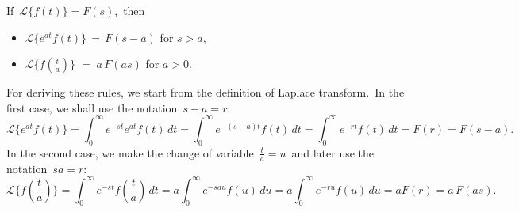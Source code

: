 \documentclass[12pt]{article}
\theoremstyle{definition}
\begin{document}
If\, $\mathcal{L}\{f(t)\} = F(s)$,\, then
\begin{itemize}
\item $\mathcal{L}\{e^{at}f(t)\} \,=\, F(s\!-\!a)$ \quad for\; $s > a$,
\item $\mathcal{L}\{f(\frac{t}{a})\} \;=\; a\,F(as)$ \qquad for\; $a > 0$.\\
\end{itemize}

For deriving these rules, we start from the definition of Laplace transform.\, In the first case, we shall use the notation \,$s\!-\!a = r$:
$$\mathcal{L}\{e^{at}f(t)\} = \int_0^\infty\!e^{-st}e^{at}f(t)\,dt = 
\int_0^\infty\!e^{-(s-a)t}f(t)\,dt = \int_0^\infty\!e^{-rt}f(t)\,dt = F(r) = F(s\!-\!a).$$ 
In the second case, we make the change of variable \,$\frac{t}{a} = u$\, and later use the notation\, $sa = r$:
$$\mathcal{L}\{f(\frac{t}{a})\} = \int_0^\infty\!e^{-st}f(\frac{t}{a})\,dt =
a\!\int_0^\infty\!e^{-sau}f(u)\,du = a\!\int_0^\infty\!e^{-ru}f(u)\,du = aF(r) = a\,F(as).$$
\end{document}
